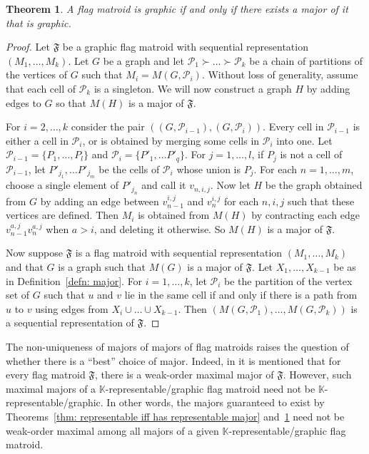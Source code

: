 \documentclass[12pt]{article}
\newtheorem{thm}{Theorem}[section]
\theoremstyle{definition}
\begin{document}
\begin{thm}\label{thm: graphic iff major is}
    A flag matroid is graphic if and only if there exists a major of it that is graphic.
\end{thm}
\begin{proof}
    Let $\mathfrak{F}$ be a graphic flag matroid with sequential representation $(M_1, \dots, M_k)$.
    Let $G$ be a graph and let $\mathcal{P}_1 \succ \dots \succ \mathcal{P}_k$ be a chain of partitions of the vertices of $G$ such that $M_i = M(G,\mathcal{P}_i)$.
    Without loss of generality, assume that each cell of $\mathcal{P}_k$ is a singleton.
    We will now construct a graph $H$ by adding edges to $G$ so that $M(H)$ is a major of $\mathfrak{F}$.

    For $i=2,\dots,k$ consider the pair $((G, \mathcal{P}_{i-1}), (G, \mathcal{P}_i))$. Every cell in $\mathcal{P}_{i-1}$ is either a cell in $\mathcal{P}_i$, or is obtained by merging some cells in $\mathcal{P}_i$ into one.
    Let $\mathcal{P}_{i-1} = \{P_1, \dots, P_l\}$ and $\mathcal{P}_i = \{P'_1, \dots P'_q\}$.
    For $j=1, \dots, l$,
    if $P_j$ is not a cell of $\mathcal{P}_{i-1}$,
    let $P'_{j_1}, \dots P'_{j_m}$ be the cells of $\mathcal{P}_i$ whose union is $P_j$.
    For each $n = 1, \dots, m$, choose a single element of $P'_{j_n}$
    and call it $v_{n,i,j}$.
    Now let $H$ be the graph obtained from $G$ by adding an edge between
    $v_{n-1}^{i,j}$ and $v_n^{i,j}$ for each $n,i,j$ such that these vertices are defined.
    Then $M_i$ is obtained from $M(H)$ by contracting each edge $v_{n-1}^{a,j}v_n^{a,j}$
    when $a > i$, and deleting it otherwise.
    So $M(H)$ is a major of $\mathfrak{F}$.

    Now suppose $\mathfrak{F}$ is a flag matroid with sequential representation $(M_1,\dots,M_k)$ and that $G$ is a graph such that $M(G)$ is a major of $\mathfrak{F}$.
    Let $X_1,\dots,X_{k-1}$ be as in Definition~\ref{defn: major}.
    For $i =1,\dots,k$, let $\mathcal{P}_i$ be the partition of the vertex set of $G$
    such that $u$ and $v$ lie in the same cell if and only if
    there is a path from $u$ to $v$ using edges from $X_{i} \cup \dots \cup X_{k-1}$.
    Then $(M(G,\mathcal{P}_1),\dots,M(G,\mathcal{P}_k))$ is a sequential representation of $\mathfrak{F}$.
\end{proof}

The non-uniqueness of majors of majors of flag matroids raises the question of whether there is a ``best'' choice of major.
Indeed, in \cite[Exercise 8.14b,c]{kung1986strong} it is mentioned that for every flag matroid $\mathfrak{F}$, there is a weak-order maximal major of $\mathfrak{F}$. However, such maximal majors of a $\mathbb{K}$-representable/graphic flag matroid need not be $\mathbb{K}$-representable/graphic.
In other words, the majors guaranteed to exist by Theorems~\ref{thm: representable iff has representable major} and~\ref{thm: graphic iff major is} need not be weak-order
maximal among all majors of a given $\mathbb{K}$-representable/graphic flag matroid.
\end{document}
